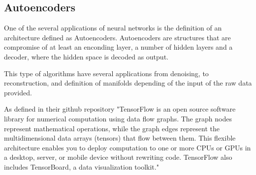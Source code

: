 \subsection{Autoencoders}  \label{subSec:Autoecoders}

One of the several applications of neural networks is the definition of an architecture defined as Autoencoders. Autoencoders are structures that are compromise of at least an enconding layer, a number of hidden layers and a decoder, where the hidden space is decoded as output.

This type of algorithms have several applications from denoising, to reconstruction, and  definition of manifolds depending of the input of the raw data provided. 


As defined in their github repository \citep{Tensorflow:2018} "TensorFlow is an open source software library for numerical computation using data flow graphs.
The graph nodes represent mathematical operations, while the graph edges represent the multidimensional data arrays 
(tensors) that flow between them. This flexible architecture enables you to deploy computation to one or more CPUs or GPUs in a desktop, 
server, or mobile device without rewriting code. TensorFlow also includes TensorBoard, a data visualization toolkit."

